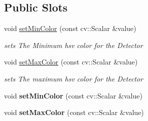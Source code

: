 \subsection*{Public Slots}
\begin{DoxyCompactItemize}
\item 
void \hyperlink{class_image_processor_1_1_detect_color_af9f1efdf1535b8a8516c3feb536fc8b8}{set\+Min\+Color} (const cv\+::\+Scalar \&value)
\begin{DoxyCompactList}\small\item\em sets The Minimum hsv color for the Detector \end{DoxyCompactList}\item 
void \hyperlink{class_image_processor_1_1_detect_color_a71bfe53fe223a7342e17e64adf483b84}{set\+Max\+Color} (const cv\+::\+Scalar \&value)
\begin{DoxyCompactList}\small\item\em sets The maximum hsv color for the Detector \end{DoxyCompactList}\item 
\mbox{\label{class_image_processor_1_1_detect_color_ad3b18613986d7f63fa7689eafd5ae54c}} 
void {\bfseries set\+Min\+Color} (const cv\+::\+Scalar \&value)
\item 
\mbox{\label{class_image_processor_1_1_detect_color_aeb4cb37a67cd8aa8f979bf46a35e1b8d}} 
void {\bfseries set\+Max\+Color} (const cv\+::\+Scalar \&value)
\end{DoxyCompactItemize}
